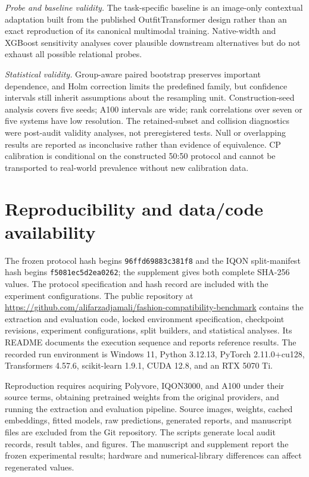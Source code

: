 \documentclass[preprint,12pt]{elsarticle}
\begin{document}
\textit{Probe and baseline validity.} The task-specific baseline is an image-only contextual adaptation built from the published OutfitTransformer design rather than an exact reproduction of its canonical multimodal training. Native-width and XGBoost sensitivity analyses cover plausible downstream alternatives but do not exhaust all possible relational probes.

\textit{Statistical validity.} Group-aware paired bootstrap preserves important dependence, and Holm correction limits the predefined family, but confidence intervals still inherit assumptions about the resampling unit. Construction-seed analysis covers five seeds; A100 intervals are wide; rank correlations over seven or five systems have low resolution. The retained-subset and collision diagnostics were post-audit validity analyses, not preregistered tests. Null or overlapping results are reported as inconclusive rather than evidence of equivalence. CP calibration is conditional on the constructed 50:50 protocol and cannot be transported to real-world prevalence without new calibration data.

\section{Reproducibility and data/code availability}\label{sec:reproducibility}

The frozen protocol hash begins \texttt{96ffd69883c381f8} and the IQON split-manifest hash begins \texttt{f5081ec5d2ea0262}; the supplement gives both complete SHA-256 values. The protocol specification and hash record are included with the experiment configurations.
The public repository at \url{https://github.com/alifarzadjamali/fashion-compatibility-benchmark} contains the extraction and evaluation code, locked environment specification, checkpoint revisions, experiment configurations, split builders, and statistical analyses. Its README documents the execution sequence and reports reference results. The recorded run environment is Windows 11, Python 3.12.13, PyTorch 2.11.0+cu128, Transformers 4.57.6, scikit-learn 1.9.1, CUDA 12.8, and an RTX 5070 Ti.

Reproduction requires acquiring Polyvore, IQON3000, and A100 under their source terms, obtaining pretrained weights from the original providers, and running the extraction and evaluation pipeline. Source images, weights, cached embeddings, fitted models, raw predictions, generated reports, and manuscript files are excluded from the Git repository. The scripts generate local audit records, result tables, and figures. The manuscript and supplement report the frozen experimental results; hardware and numerical-library differences can affect regenerated values.
\end{document}
